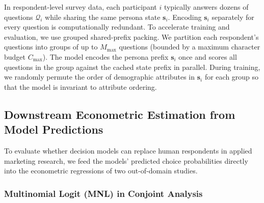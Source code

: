 \documentclass[
  letterpaper,
  DIV=11,
  numbers=noendperiod]{scrartcl}
\begin{document}
In respondent-level survey data, each participant \(i\) typically
answers dozens of questions \(\mathcal{Q}_i\) while sharing the same
persona state \(\mathbf{s}_i\). Encoding \(\mathbf{s}_i\) separately for
every question is computationally redundant. To accelerate training and
evaluation, we use grouped shared-prefix packing. We partition each
respondent's questions into groups of up to \(M_{\max}\) questions
(bounded by a maximum character budget \(C_{\max}\)). The model encodes
the persona prefix \(\mathbf{s}_i\) once and scores all questions in the
group against the cached state prefix in parallel. During training, we
randomly permute the order of demographic attributes in \(\mathbf{s}_i\)
for each group so that the model is invariant to attribute ordering.

\subsection{Downstream Econometric Estimation from Model
Predictions}\label{downstream-econometric-estimation-from-model-predictions}

To evaluate whether decision models can replace human respondents in
applied marketing research, we feed the models' predicted choice
probabilities directly into the econometric regressions of two
out-of-domain studies.

\subsubsection{Multinomial Logit (MNL) in Conjoint
Analysis}\label{multinomial-logit-mnl-in-conjoint-analysis}
\end{document}
